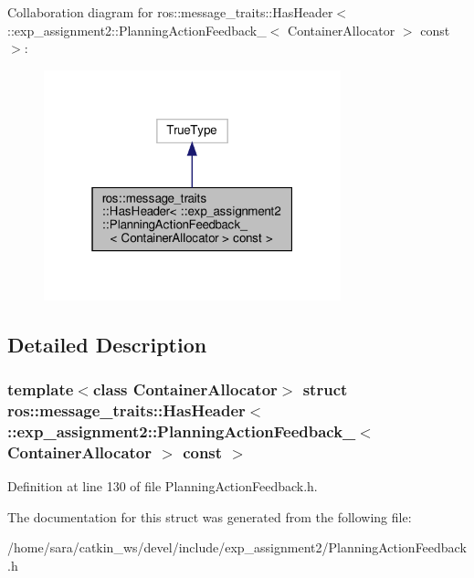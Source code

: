 Collaboration diagram for ros\+:\+:message\+\_\+traits\+:\+:Has\+Header$<$ \+:\+:exp\+\_\+assignment2\+:\+:Planning\+Action\+Feedback\+\_\+$<$ Container\+Allocator $>$ const $>$\+:
\nopagebreak
\begin{figure}[H]
\begin{center}
\leavevmode
\includegraphics[width=244pt]{structros_1_1message__traits_1_1HasHeader_3_01_1_1exp__assignment2_1_1PlanningActionFeedback___390c7f97a27f3ca191641ea32757eaefd}
\end{center}
\end{figure}


\subsection{Detailed Description}
\subsubsection*{template$<$class Container\+Allocator$>$\newline
struct ros\+::message\+\_\+traits\+::\+Has\+Header$<$ \+::exp\+\_\+assignment2\+::\+Planning\+Action\+Feedback\+\_\+$<$ Container\+Allocator $>$ const $>$}



Definition at line 130 of file Planning\+Action\+Feedback.\+h.



The documentation for this struct was generated from the following file\+:\begin{DoxyCompactItemize}
\item 
/home/sara/catkin\+\_\+ws/devel/include/exp\+\_\+assignment2/Planning\+Action\+Feedback.\+h\end{DoxyCompactItemize}
